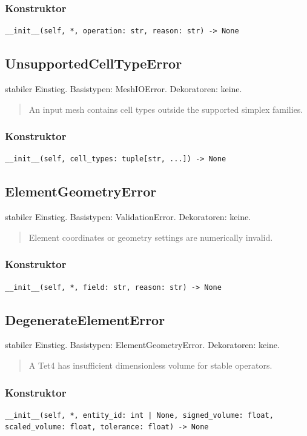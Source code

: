 \subsubsection*{Konstruktor}
\begin{lstlisting}
__init__(self, *, operation: str, reason: str) -> None
\end{lstlisting}
\subsection{UnsupportedCellTypeError}
stabiler Einstieg.
Basistypen: MeshIOError. Dekoratoren: keine.
\begin{quote}
An input mesh contains cell types outside the supported simplex families.
\end{quote}
\subsubsection*{Konstruktor}
\begin{lstlisting}
__init__(self, cell_types: tuple[str, ...]) -> None
\end{lstlisting}
\subsection{ElementGeometryError}
stabiler Einstieg.
Basistypen: ValidationError. Dekoratoren: keine.
\begin{quote}
Element coordinates or geometry settings are numerically invalid.
\end{quote}
\subsubsection*{Konstruktor}
\begin{lstlisting}
__init__(self, *, field: str, reason: str) -> None
\end{lstlisting}
\subsection{DegenerateElementError}
stabiler Einstieg.
Basistypen: ElementGeometryError. Dekoratoren: keine.
\begin{quote}
A Tet4 has insufficient dimensionless volume for stable operators.
\end{quote}
\subsubsection*{Konstruktor}
\begin{lstlisting}
__init__(self, *, entity_id: int | None, signed_volume: float, scaled_volume: float, tolerance: float) -> None
\end{lstlisting}
